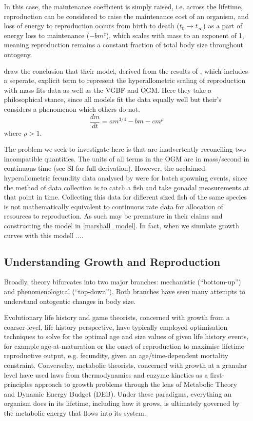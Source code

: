 \documentclass[a4paper]{article} %
\begin{document}
            In this case, the maintenance coefficient is simply raised, i.e. across the lifetime, reproduction can be considered to raise the maintenance cost of an organism, and loss of energy to reproduction occurs from birth to death ($t_0 \rightarrow t_{\infty}$) as a part of energy loss to maintenance ($-bm^z$), which scales with mass to an exponent of 1, meaning reproduction remains a constant fraction of total body size throughout ontogeny.

            \cite{Marshall2019b} draw the conclusion that their model, derived from the results of \cite{Barneche2018d}, which includes a seperate, explicit term to represent the hyperallometric scaling of reproduction with mass fits data as well as the VGBF and \cite{West2001} OGM. Here they take a philosophical stance, since all models fit the data equally well but their's considers a phenomenon which others do not.
            \begin{equation}
                \frac{dm}{dt} = am^{3/4} - bm - cm^{\rho} \label{marshall_model}
            \end{equation}
            where $\rho > 1$.

            The problem we seek to investigate here is that \cite{Marshall2019b} are inadvertently reconciling two incompatible quantities. The units of all terms in the OGM are in mass/second in continuous time (see SI for full derivation). However, the acclaimed hyperallometric fecundity data analysed by \cite{Barneche2018d} were for batch spawning events, since the method of data collection is to catch a fish and take gonadal measurements at that point in time. Collecting this data for different sized fish of the same species is not mathematically equivalent to continuous rate data for allocation of resources to reproduction. As such \cite{Malerba2019} may be premature in their claims and constructing the model in \eqref{marshall_model}.
            In fact, when we simulate growth curves with this modell ....
        \subsection{Understanding Growth and Reproduction}
        Broadly, theory bifurcates into two major branches: mechanistic (``bottom-up'') and phenomenological (``top-down''). Both branches have seen many attempts to understand ontogentic changes in body size.  
        
        Evolutionary life history and game theorists, concerned with growth from a coarser-level, life history perspective, have typically employed optimisation techniques to solve for the optimal age and size values of given life history events, for example age-at-maturation or the onset of reproduction to maximise lifetime reproductive output, e.g. fecundity, given an age/time-dependent mortality constraint. Converseley, metabolic theorists, concerned with growth at a granular level have used laws from thermodynamics and enzyme kinetics as a first-principles approach to growth problems through the lens of Metabolic Theory and Dynamic Energy Budget (DEB). Under these paradigms, everything an organism does in its lifetime, including how it grows, is ultimately governed by the metabolic energy that flows into its system. 
\end{document}
